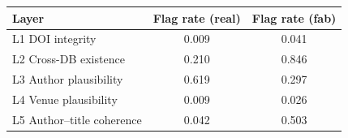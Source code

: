 \begin{tabular}{lcc}
\toprule
Layer                          & Flag rate (real) & Flag rate (fab) \\
\midrule
L1 DOI integrity                 & 0.009 & 0.041 \\
L2 Cross-DB existence            & 0.210 & 0.846 \\
L3 Author plausibility           & 0.619 & 0.297 \\
L4 Venue plausibility            & 0.009 & 0.026 \\
L5 Author--title coherence       & 0.042 & 0.503 \\
\bottomrule
\end{tabular}

